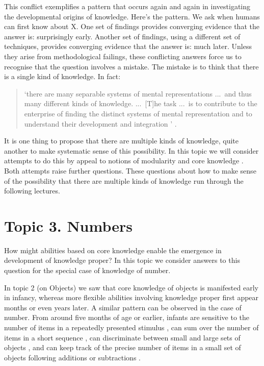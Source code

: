 \documentclass[12pt,\papersize]{extarticle}
\begin{document}
This conflict exemplifies a pattern that occurs again and again in investigating the developmental origins of knowledge. 
Here's the pattern.
We ask when humans can first know about X. 
One set of findings provides converging evidence that the answer is: surprisingly early.
Another set of findings, using a different set of techniques,  provides converging evidence that the answer is: much later. 
Unless they arise from methodological failings, these conflicting answers force us to recognise that the question involves a mistake. 
The mistake is to think that there is a single kind of knowledge. 
In fact:
%
\begin{quote}
`there are many separable systems of mental representations ...\ and thus many different kinds of knowledge. ...\ 
[T]he task ...\ is to contribute to the enterprise of finding the distinct systems of mental representation and to understand their development and integration%
'
\citep[p.\ 1522]{Hood:2000bf}.
\end{quote}
%
It is one thing to propose that there are multiple kinds of knowledge, quite another to make systematic sense of this possibility.
In this topic we will consider attempts to do this by appeal to notions of modularity \citep{Fodor:1983dg}
and core knowledge \citep{Spelke:2007hb}. 
Both attempts raise further questions.  
These questions about how to make sense of the possibility that there are multiple kinds of knowledge 
run through the following lectures. 



\section{Topic 3. Numbers}

How might abilities based on core knowledge enable the emergence in development of knowledge proper? 
In this topic we consider answers to this question for the special case of knowledge of number.

In topic 2 (on Objects) we saw that core knowledge of objects is manifested early in infancy, whereas more flexible abilities involving knowledge proper first appear months or even years later. 
A similar pattern can be observed in the case of number. 
From around five months of age or earlier, infants 
are sensitive to the number of items in a repeatedly presented stimulus \citep{starkey:1980_perception}, 
can sum over the number of items in a short sequence \citep{wynn:1996_infants}, 
can discriminate between small and large sets of objects \citep{xu:2000_large}, 
and can keep track of the precise number of items in a small set of objects following additions or subtractions \citep{wynn:1992_addition}. 
\end{document}
